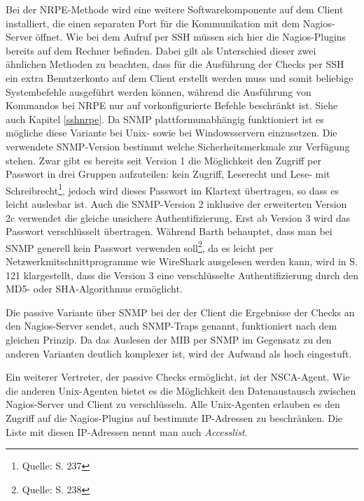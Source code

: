 Bei der \gls{NRPE}-Methode wird eine weitere Softwarekomponente auf dem Client installiert, die einen separaten Port für die Kommunikation mit dem Nagios-Server öffnet.
Wie bei dem Aufruf per \gls{SSH} müssen sich hier die Nagios-Plugins bereits auf dem Rechner befinden.
Dabei gilt als Unterschied dieser zwei ähnlichen Methoden zu beachten, dass für die Ausführung der Checks per \gls{SSH} ein extra Benutzerkonto auf dem Client erstellt werden muss und somit beliebige Systembefehle ausgeführt werden können, während die Ausführung von Kommandos bei \gls{NRPE} nur auf vorkonfigurierte Befehle beschränkt ist.
Siehe auch Kapitel \ref{sshnrpe}.
\label{unixagents}
Da \gls{SNMP} plattformunabhängig funktioniert ist es mögliche diese Variante bei Unix- sowie bei Windowsservern einzusetzen.
Die verwendete \gls{SNMP}-Version bestimmt welche Sicherheitsmerkmale zur Verfügung stehen.
Zwar gibt es bereits seit Version 1 die Möglichkeit den Zugriff per Passwort in drei Gruppen aufzuteilen: kein Zugriff, Leserecht und Lese- mit Schreibrecht\footnote{Quelle: \cite{Barth08} S. 237}, jedoch wird dieses Passwort im Klartext übertragen, so dass es leicht auslesbar ist.
Auch die \gls{SNMP}-Version 2 inklusive der erweiterten Version 2c verwendet die gleiche unsichere Authentifizierung.
Erst ab Version 3 wird das Passwort verschlüsselt übertragen.
Während Barth behauptet, dass man bei \gls{SNMP} generell kein Passwort verwenden soll\footnote{Quelle: \cite{Barth08} S. 238}, da es leicht per Netzwerkmitschnittprogramme wie WireShark ausgelesen werden kann, wird in \cite{Jose07} S. 121 klargestellt, dass die Version 3 eine verschlüsselte Authentifizierung durch den MD5- oder SHA-Algorithmus ermöglicht.

Die passive Variante über \gls{SNMP} bei der der Client die Ergebnisse der Checks an den Nagios-Server sendet, auch \gls{SNMP}-Traps genannt, funktioniert nach dem gleichen Prinzip.
Da das Auslesen der \gls{MIB} per \gls{SNMP} im Gegensatz zu den anderen Varianten deutlich komplexer ist, wird der Aufwand als hoch eingestuft.

Ein weiterer Vertreter, der passive Checks ermöglicht, ist der \gls{NSCA}-Agent.
Wie die anderen Unix-Agenten bietet es die Möglichkeit den Datenaustausch zwischen Nagios-Server und Client zu verschlüsseln.
Alle Unix-Agenten erlauben es den Zugriff auf die Nagios-Plugins auf bestimmte \gls{IP}-Adressen zu beschränken.
Die Liste mit diesen \gls{IP}-Adressen nennt man auch \textit{Accesslist}.

